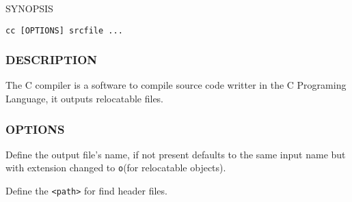 \noindent SYNOPSIS

\begin{lstlisting}[style=bash]
cc [OPTIONS] srcfile ...
\end{lstlisting}

\subsubsection*{DESCRIPTION}

The C compiler is a software to compile source code writter in the
C Programing Language,
it outputs relocatable files.

\subsubsection*{OPTIONS}

\begin{description}[style=multiline,leftmargin=5cm]
   \item[\texttt{-o <name>}]
   Define the output file's name,
   if not present defaults to the same input name but with
   extension changed to \texttt{o}(for relocatable objects).
   \item[\texttt{-I <path>}]
   Define the \texttt{<path>} for find header files.
\end{description}


